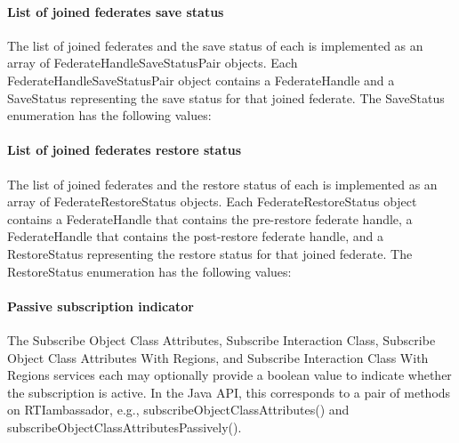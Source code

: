 \begin{compactstdpage}

    \paragraph{List of joined federates save status}

    The list of joined federates and the save status of each is implemented as an array of FederateHandleSaveStatusPair objects. Each FederateHandleSaveStatusPair object contains a FederateHandle and a SaveStatus representing the save status for that joined federate. The SaveStatus enumeration has the following values:


    \paragraph{List of joined federates restore status}

    The list of joined federates and the restore status of each is implemented as an array of FederateRestoreStatus objects. Each FederateRestoreStatus object contains a FederateHandle that contains the pre-restore federate handle, a FederateHandle that contains the post-restore federate handle, and a RestoreStatus representing the restore status for that joined federate. The RestoreStatus enumeration has the following values:


    \paragraph{Passive subscription indicator}

    The Subscribe Object Class Attributes, Subscribe Interaction Class, Subscribe Object Class Attributes With Regions, and Subscribe Interaction Class With Regions services each may optionally provide a boolean value to indicate whether the subscription is active. In the Java API, this corresponds to a pair of methods on RTIambassador,                 e.g.,           subscribeObjectClassAttributes()                            and subscribeObjectClassAttributesPassively().


\end{compactstdpage}
